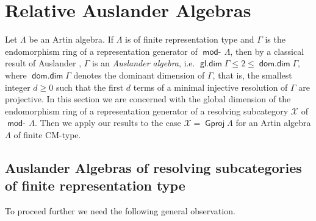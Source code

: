 \documentclass[oneside, a4paper,reqno]{amsart}
\numberwithin{equation}{section}
\theoremstyle{definition}
\begin{document}
\section{Relative Auslander Algebras} Let $\Lambda$ be an Artin
algebra. If $\Lambda$ is of finite representation type and $\Gamma$
is the endomorphism ring of a representation generator of
$\operatorname*{\mathsf{mod}-\!}\Lambda$, then  by a classical result of Auslander
\cite{Auslander:queen}, $\Gamma$ is an {\em Auslander algebra}, i.e.
$\operatorname*{\mathsf{gl.dim}}\Gamma \leq 2 \leq \operatorname*{\mathsf{dom.dim}}\Gamma$, where $\operatorname*{\mathsf{dom.dim}}\Gamma$ denotes the
dominant dimension of $\Gamma$, that is, the smallest integer $d\geq
0$ such that the first $d$ terms of a minimal injective resolution
of $\Gamma$ are projective. In this section we are concerned with
the global dimension of the endomorphism ring of a representation
generator of a resolving subcategory ${\mathcal X}$ of $\operatorname*{\mathsf{mod}-\!}\Lambda$. Then we
apply our results to the case ${\mathcal X} = {\operatorname{\mathsf{Gproj}}\nolimits}\Lambda$ for an Artin
algebra $\Lambda$ of finite CM-type.

\subsection{Auslander Algebras of resolving subcategories of finite representation type}
To proceed further we need the following general observation.
\end{document}
